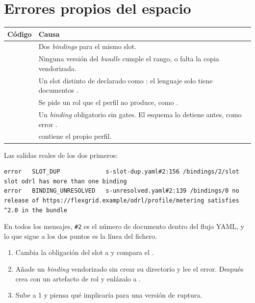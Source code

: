 \section{Errores propios del espacio}

\noindent\begin{tabularx}{\linewidth}{@{}L{4.6cm}Y@{}}
\toprule
\textbf{Código} & \textbf{Causa} \\
\midrule
{} & Dos \emph{bindings} para el mismo slot. \\
 & Ninguna versión del \emph{bundle} cumple el rango, o falta la copia vendorizada. \\
 & Un slot distinto de  declarado como : el lenguaje solo tiene documentos . \\
 & Se pide un rol que el perfil no produce, como . \\
 & Un \emph{binding} obligatorio sin gates. El esquema lo detiene antes, como error . \\
 &  contiene el propio perfil. \\
\bottomrule
\end{tabularx}

\medskip
Las salidas reales de los dos primeros:

\begin{lstlisting}[style=out]
error   SLOT_DUP             s-slot-dup.yaml#2:156 /bindings/2/slot slot odrl has more than one binding
error   BINDING_UNRESOLVED   s-unresolved.yaml#2:139 /bindings/0 no release of https://flexgrid.example/odrl/profile/metering satisfies ^2.0 in the bundle
\end{lstlisting}

En todos los mensajes, \texttt{\#2} es el número de documento dentro del flujo YAML, y lo que sigue a los dos puntos
es la línea del fichero.

\begin{retos}
\begin{enumerate}[leftmargin=*, itemsep=2pt]
  \item Cambia la obligación del slot  a  y compara el .
  \item Añade un \emph{binding}  vendorizado sin crear su directorio y lee el error. Después crea
         con un artefacto de rol  y enlázalo a .
  \item Sube  a 1 y piensa qué implicaría para una versión de ruptura.
\end{enumerate}
\end{retos}
